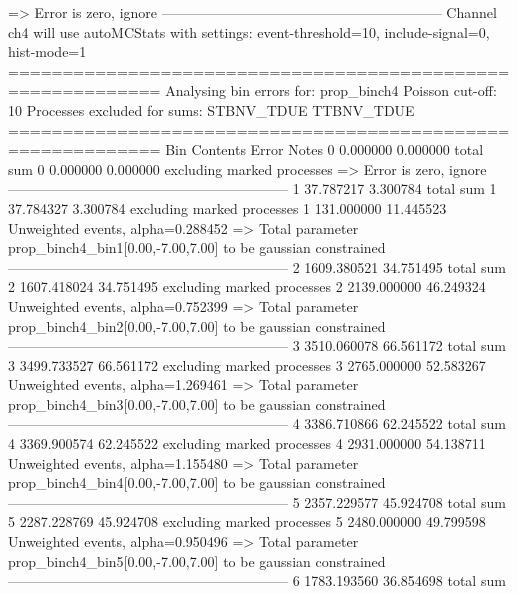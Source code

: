   => Error is zero, ignore      
------------------------------------------------------------
Channel ch4 will use autoMCStats with settings: event-threshold=10, include-signal=0, hist-mode=1
============================================================
Analysing bin errors for: prop_binch4
Poisson cut-off: 10
Processes excluded for sums: STBNV_TDUE TTBNV_TDUE
============================================================
Bin        Contents        Error           Notes                         
0          0.000000        0.000000        total sum                     
0          0.000000        0.000000        excluding marked processes    
  => Error is zero, ignore      
------------------------------------------------------------
1          37.787217       3.300784        total sum                     
1          37.784327       3.300784        excluding marked processes    
1          131.000000      11.445523       Unweighted events, alpha=0.288452
  => Total parameter prop_binch4_bin1[0.00,-7.00,7.00] to be gaussian constrained
------------------------------------------------------------
2          1609.380521     34.751495       total sum                     
2          1607.418024     34.751495       excluding marked processes    
2          2139.000000     46.249324       Unweighted events, alpha=0.752399
  => Total parameter prop_binch4_bin2[0.00,-7.00,7.00] to be gaussian constrained
------------------------------------------------------------
3          3510.060078     66.561172       total sum                     
3          3499.733527     66.561172       excluding marked processes    
3          2765.000000     52.583267       Unweighted events, alpha=1.269461
  => Total parameter prop_binch4_bin3[0.00,-7.00,7.00] to be gaussian constrained
------------------------------------------------------------
4          3386.710866     62.245522       total sum                     
4          3369.900574     62.245522       excluding marked processes    
4          2931.000000     54.138711       Unweighted events, alpha=1.155480
  => Total parameter prop_binch4_bin4[0.00,-7.00,7.00] to be gaussian constrained
------------------------------------------------------------
5          2357.229577     45.924708       total sum                     
5          2287.228769     45.924708       excluding marked processes    
5          2480.000000     49.799598       Unweighted events, alpha=0.950496
  => Total parameter prop_binch4_bin5[0.00,-7.00,7.00] to be gaussian constrained
------------------------------------------------------------
6          1783.193560     36.854698       total sum                     
